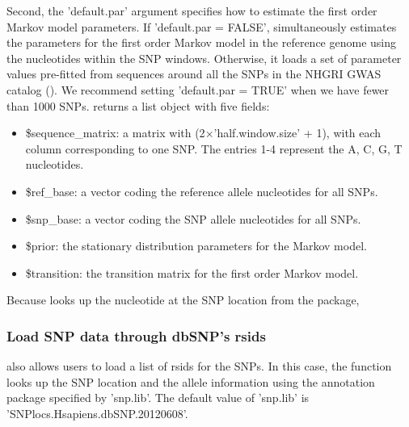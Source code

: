 \documentclass[a4paper,10pt]{article}\usepackage[]{graphicx}\usepackage[]{color}
\begin{document}

Second, the 'default.par' argument specifies how to estimate the first order Markov model parameters. If 'default.par = FALSE',  simultaneously estimates the parameters for the first order Markov model in the reference genome using the nucleotides within the SNP windows. Otherwise, it loads a set of parameter values pre-fitted from sequences around all the SNPs in the NHGRI GWAS catalog (\cite{nhgri-gwas}). We recommend setting 'default.par = TRUE' when we have fewer than 1000 SNPs.  returns a list object with five fields:
\begin{itemize}
\item \$sequence\_matrix: a matrix with (2$\times$'half.window.size' + 1), with each column corresponding to one SNP. The entries 1-4 represent the A, C, G, T nucleotides.
\item \$ref\_base: a vector coding the reference allele nucleotides for all SNPs.
\item \$snp\_base: a vector coding the SNP allele nucleotides for all SNPs.
\item \$prior: the stationary distribution parameters for the Markov model.
\item \$transition: the transition matrix for the first order Markov model.
\end{itemize}

Because  looks up the nucleotide at the SNP location from the  package, 

\subsubsection{Load SNP data through dbSNP's rsids}

 also allows users to load a list of rsids for the SNPs. In this case, the function looks up the SNP location and the allele information using the annotation package specified by 'snp.lib'. The default value of 'snp.lib' is 'SNPlocs.Hsapiens.dbSNP.20120608'.
\end{document}
